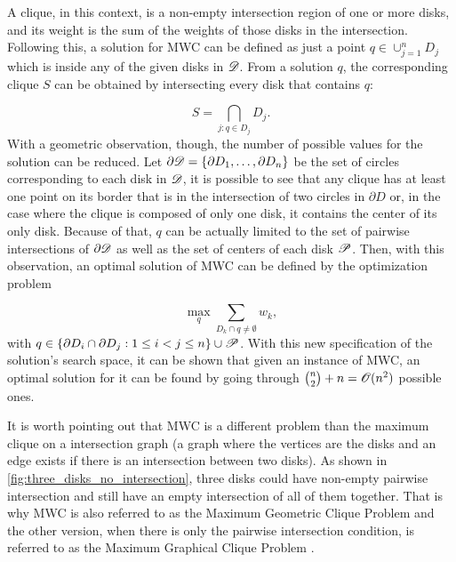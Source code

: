 A clique, in this context, is a non-empty intersection region of one or more disks, and its weight is the sum of the weights of those disks in the intersection.
Following this, a solution for MWC can be defined as just a point $q\in\cup_{j=1}^n D_j$ which is inside any of the given disks in $\mathscr{D}$.
From a solution $q$, the corresponding clique $S$ can be obtained by intersecting every disk that contains $q$:

\begin{equation*}
S = \bigcap_{j : q \in D_j} D_j.
\end{equation*}
With a geometric observation, though, the number of possible values for the solution can be reduced.
Let $\partial \mathscr{D} = \{ \partial D_1, \dots, \partial D_n \}$ be the set of circles corresponding to each disk in $\mathscr{D}$, it is possible to see that any clique has at least one point on its border that is in the intersection of two circles in $\partial D$ or, in the case where the clique is composed of only one disk, it contains the center of its only disk. Because of that, $q$ can be actually limited to the set of pairwise intersections of $\partial \mathscr{D}$ as well as the set of centers of each disk $\mathscr{P}$. Then, with this observation, an optimal solution of MWC can be defined by the optimization problem

\begin{equation*}
\max_{q} \sum_{D_k \cap q \neq \emptyset} w_k,
\end{equation*}
with $q \in \{\partial D_i \cap \partial D_j : 1 \le i < j \le n\} \cup \mathscr{P}$. With this new specification of the solution's search space, it can be shown that given an instance of MWC, an optimal solution for it can be found by going through $\binom{n}{2} + n = \mathscr{O}(n^2)$ possible ones.

It is worth pointing out that MWC is a different problem than the maximum clique on a intersection graph (a graph where the vertices are the disks and an edge exists if there is an intersection between two disks). 
As shown in \autoref{fig:three_disks_no_intersection}, three disks could have non-empty pairwise intersection and still have an empty intersection of all of them together.
That is why MWC is also referred to as the Maximum Geometric Clique Problem and the other version, when there is only the pairwise intersection condition, is referred to as the Maximum Graphical Clique Problem \cite{inplace:2014}. 


